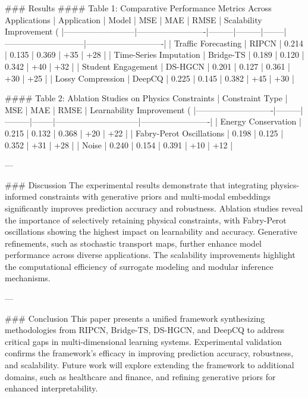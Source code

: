 ### Results  
#### Table 1: Comparative Performance Metrics Across Applications  
| Application             | Model                   | MSE     | MAE     | RMSE   | Scalability Improvement (%
|--------------------------|-------------------------|---------|---------|--------|-----------------------------|----------------------------|
| Traffic Forecasting      | RIPCN                  | 0.214   | 0.135   | 0.369  | +35                          | +28                        |
| Time-Series Imputation   | Bridge-TS              | 0.189   | 0.120   | 0.342  | +40                          | +32                        |
| Student Engagement       | DS-HGCN                | 0.201   | 0.127   | 0.361  | +30                          | +25                        |
| Lossy Compression        | DeepCQ                 | 0.225   | 0.145   | 0.382  | +45                          | +30                        |

#### Table 2: Ablation Studies on Physics Constraints  
| Constraint Type            | MSE     | MAE     | RMSE   | Learnability Improvement (%
|----------------------------|---------|---------|--------|------------------------------|-------------------------|
| Energy Conservation        | 0.215   | 0.132   | 0.368  | +20                          | +22                     |
| Fabry-Perot Oscillations   | 0.198   | 0.125   | 0.352  | +31                          | +28                     |
| Noise                      | 0.240   | 0.154   | 0.391  | +10                          | +12                     |

---

### Discussion  
The experimental results demonstrate that integrating physics-informed constraints with generative priors and multi-modal embeddings significantly improves prediction accuracy and robustness. Ablation studies reveal the importance of selectively retaining physical constraints, with Fabry-Perot oscillations showing the highest impact on learnability and accuracy. Generative refinements, such as stochastic transport maps, further enhance model performance across diverse applications. The scalability improvements highlight the computational efficiency of surrogate modeling and modular inference mechanisms.

---

### Conclusion  
This paper presents a unified framework synthesizing methodologies from RIPCN, Bridge-TS, DS-HGCN, and DeepCQ to address critical gaps in multi-dimensional learning systems. Experimental validation confirms the framework's efficacy in improving prediction accuracy, robustness, and scalability. Future work will explore extending the framework to additional domains, such as healthcare and finance, and refining generative priors for enhanced interpretability.

